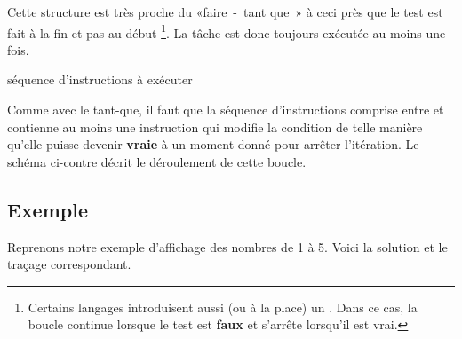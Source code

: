 	Cette structure est très proche du «faire~-~tant que~» 
	à ceci près que le test est fait à la fin et pas au début%
	\footnote{%
		Certains langages introduisent aussi (ou à la place)
		un .
		Dans ce cas, la boucle continue lorsque le test est
		\textbf{faux} et s’arrête lorsqu’il est vrai.
	}. 
	La tâche est donc toujours exécutée au moins une fois.

	\begin{LDA}
	\Repeat
		\Stmt séquence d’instructions à exécuter
	\end{LDA}

	Comme avec le tant-que, 
	il faut que la séquence d’instructions comprise entre
	 et  
	contienne au moins une instruction qui modifie la condition de
	telle manière qu’elle puisse devenir \textbf{vraie} à un moment donné
	pour arrêter l’itération. 
	Le schéma ci-contre décrit le déroulement de cette boucle. 

	\subsection{Exemple}

		Reprenons notre exemple d’affichage des nombres de 1 à 5.
		Voici la solution et le traçage correspondant.

